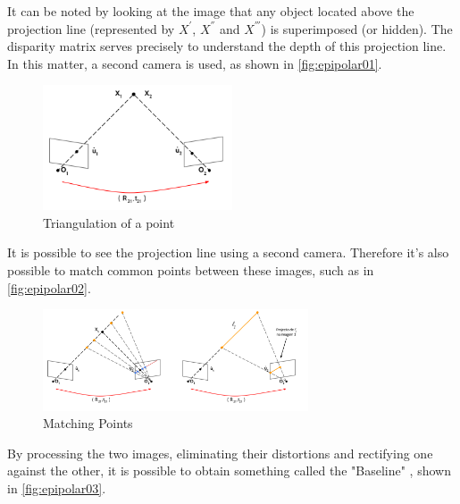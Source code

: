     It can be noted by looking at the image that any object located above the projection line (represented by \(X^{'}\), \(X^{''}\) and \(X^{'''}\)) is superimposed (or hidden). The disparity matrix serves precisely to understand the depth of this projection line. In this matter, a second camera is used, as shown in \autoref{fig:epipolar01}.

    \begin{figure}[H]
     \caption{\label{fig:epipolar01}
Triangulation of a point}
     \begin{center}
        \includegraphics[width=0.5\textwidth]{images/epipolar1.png}
     \end{center}
    \end{figure}
    
    It is possible to see the projection line using a second camera. Therefore it's also possible to match common points between these images, such as in \autoref{fig:epipolar02}.

    \begin{figure}[H]
     \caption{\label{fig:epipolar02}
Matching Points}
     \begin{center}
        \includegraphics[width=0.7\textwidth]{images/epipolar2.png}
     \end{center}
    \end{figure}
    
    By processing the two images, eliminating their distortions and rectifying one against the other, it is possible to obtain something called the "Baseline" \cite{geometriaEpipolarLeonardo}, shown in \autoref{fig:epipolar03}.

